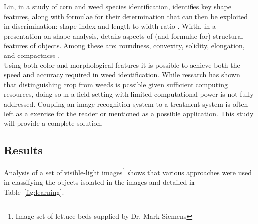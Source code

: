 \documentclass[letterpaper]{article}
\begin{document}
Lin, in a study of corn and weed species identification, identifies key shape features, along with formulae for their determination that can then be exploited in discrimination: shape index and length-to-width ratio \parencite{Lin2017-xq}. Wirth, in a presentation on shape analysis, details aspects of (and formulae for) structural features of objects. Among these are: roundness, convexity, solidity, elongation, and compactness \parencite{Wirth2004-li}.\\
Using both color and morphological features it is possible to achieve both the speed and accuracy required in weed identification. While research has shown that distinguishing crop from weeds is possible given sufficient computing resources, doing so in a field setting with limited computational power is not fully addressed. Coupling an image recognition system to a treatment system is often left as a exercise for the reader or mentioned as a possible application. This study will provide a complete solution.


\subsection{Results}
Analysis of a set of visible-light images\footnote{Image set of lettuce beds supplied by Dr. Mark Siemens} shows that various approaches were used in classifying the objects isolated in the images and detailed in Table~\ref{fig:learning}.
\end{document}
